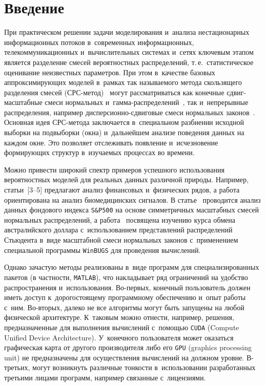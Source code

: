 \begin{multicols}{2}

\label{st\stat}


\section{Введение}

При практическом решении задачи моделирования и~анализа нестационарных 
информационных потоков в~современных информационных, телекоммуникационных 
и~вычислительных системах и~сетях ключевым этапом является разделение смесей 
вероятностных распределений, т.\,е.\ статистическое оценивание неизвестных параметров. 
При этом в~качестве базовых аппроксимирующих моделей в~рамках так называемого 
метода скользящего разделения смесей (СРС-ме\-тод)~\cite{Korolev2011} могут 
рассматриваться как конечные сдвиг-мас\-штаб\-ные смеси нормальных 
и~гам\-ма-рас\-пре\-де\-ле\-ний~\cite{Korolev2011}, так и~непрерывные распределения, 
например дис\-пер\-си\-он\-но-сдви\-го\-вые смеси нормальных законов~\cite{Korolev2015}. 
Основная идея СРС-ме\-то\-да заключается в~специальном разбиении исходной выборки 
на подвыборки (окна) и~дальнейшем анализе поведения данных на каж\-дом окне. 
Это позволяет отслеживать появление и~исчезновение формирующих структур 
в~изучаемых процессах во времени.

Можно привести широкий спектр примеров успешного использования
вероятностных моделей для реальных данных различной природы.
Например, статьи~[3--5] предлагают анализ финансовых и~физических
рядов, а работа~\cite{Hamedi2015} ориентирована на анализ
биомедицинских сигналов. В статье~\cite{Abanto2010} проводится
анализ данных фондового индекса \verb"S&P500" на основе симметричных
масштабных смесей нормальных распределений, а работа~\cite{Wang2011}
посвящена изучению курса обмена австралийского доллара 
с~использованием представлений распределений Стьюдента в~виде
масштабной смеси нормальных законов с~применением специальной
программы \verb"WinBUGS" для проведения вычислений.

Однако зачастую методы реализованы в~виде программ для специализированных 
пакетов (в частности, \verb"MATLAB"), что накладывает ряд ограничений 
на удобство распространения и~использования.  Во-пер\-вых, конечный пользователь 
должен иметь доступ к~дорогостоящему программному обеспечению и~опыт работы с~ним. 
Во-вто\-рых, далеко не все алгоритмы могут быть запущены на любой физической 
архитектуре. К~таковым можно отнести, например, решения, предназначенные для 
выполнения вычислений с~по\-мощью  \verb"CUDA" (Compute Unified Device
Architecture).  У~конечного пользователя может 
оказаться графическая карта от другого производителя либо его  \verb"GPU"  (graphics processing
unit) не предназначены для осуществления вычислений на должном уровне. В-третьих, 
могут возникнуть различные тонкости в~использовании разработанных третьими 
лицами программ, например связанные с~лицензиями. 


\end{multicols}
